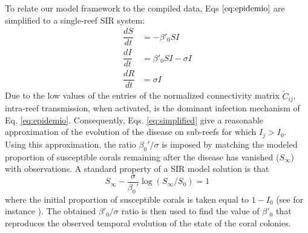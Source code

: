 \documentclass[utf8]{frontiersSCNS}
\begin{document}
To relate our model framework to the compiled data, Eqs $\ref{eq:epidemio}$ are simplified to a single-reef SIR system:
\begin{equation}
    \begin{aligned}
        \dfrac{dS}{dt} &= -\beta'_0SI \\
        \dfrac{dI}{dt} &= \beta'_0SI - \sigma I \\
        \dfrac{dR}{dt} &= \sigma I
    \end{aligned}\label{eq:simplified}
\end{equation}
Due to the low values of the entries of the normalized connectivity matrix $\tilde{C}_{ij}$, intra-reef transmission, when activated, is the dominant infection mechanism of Eq. \ref{eq:epidemio}. Consequently, Eqs. \ref{eq:simplified} give a reasonable approximation of the evolution of the disease on sub-reefs for which $I_j > I_0$. Using this approximation, the ratio $\beta_0'/\sigma$ is imposed by matching the modeled proportion of susceptible corals remaining after the disease has vanished ($S_\infty$) with observations. A standard property of a SIR model solution is that
\begin{equation}
    S_\infty - \frac{\sigma}{\beta_0'}\log(S_{\infty}/S_0) = 1\label{eq:ratio}
\end{equation}
where the initial proportion of susceptible corals is taken equal to $1-I_0$ (see for instance \cite{Murray07}). The obtained $\beta'_0/\sigma$ ratio is then used to find the value of $\beta'_0$ that reproduces the observed temporal evolution of the state of the coral colonies.
\end{document}
